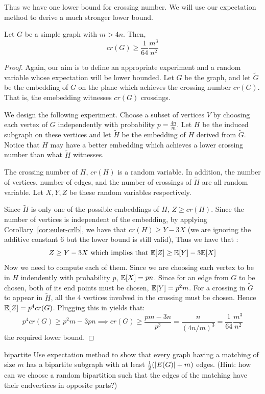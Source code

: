 Thus we have one lower bound for crossing number. We will use our expectation method to derive a much stronger lower bound.

\begin{theorem}
Let $G$ be a simple graph with $m > 4n$. Then,
$$cr(G) \ge \frac{1}{64}\frac{m^3}{n^2}$$
\end{theorem}
\begin{proof}
Again, our aim is to define an appropriate experiment and a random variable whose expectation will be lower bounded. Let $G$ be the graph, and let $\tilde{G}$ be the embedding of $G$ on the plane which achieves the crossing number $cr(G)$. That is, the emebedding witnesses $cr(G)$ crossings.

We design the following experiment. Choose a subset of vertices $V$ by choosing each vertex of $G$ independently with probability $p = \frac{4n}{m}$. Let $H$ be the induced subgraph on these vertices and let $\tilde{H}$ be the embedding of $H$ derived from $\tilde{G}$. Notice that $H$ may have a better embedding which achieves a lower crossing number than what $\tilde{H}$ witnesses.

The crossing number of $H$, $cr(H)$ is a random variable. In addition, the number of vertices, number of edges, and the number of crossings of $\tilde{H}$ are all random variable. Let $X,Y,Z$ be these random variables respectively. 

Since $\tilde{H}$ is only one of the possible embeddings of $H$, $Z \ge cr(H)$. Since the number of vertices is independent of the embedding, by applying Corollary~\ref{cor:euler-crlb}, we have that $cr(H) \ge Y-3X$ (we are ignoring the additive constant 6 but the lower bound is still valid), Thus we have that :
$$Z \ge Y-3X \textrm{ which implies that } {\mathbb E}[Z] \ge {\mathbb E}[Y]-3{\mathbb E}[X]$$
Now we need to compute each of them. Since we are choosing each vertex to be in $H$ indendently with probability $p$, ${\mathbb E}[X] = pn$. Since for an edge from $G$ to be chosen, both of its end points must be chosen, ${\mathbb E}[Y] = p^2m$. For a crossing in $\tilde{G}$ to appear in $\tilde{H}$, all the 4 vertices involved in the crossing must be chosen. Hence ${\mathbb E}[Z] = p^4cr(G)$. Plugging this in yields that:
$$p^4cr(G) \ge p^2m - 3pn \implies cr(G) \ge \frac{pm-3n}{p^3} = \frac{n}{(4n/m)^3} = \frac{1}{64}\frac{m^3}{n^2}$$ the required lower bound.
\end{proof}

\begin{exercise-prob}
\begin{show-ps2}{bipartite}
Use expectation method to show that every graph having a matching of size $m$ has a bipartite subgraph with at least $\frac{1}{2}(|E(G)|+m)$ edges. (Hint: how can we choose a random bipartition such that the edges of the matching have their endvertices in opposite parts?)
\end{show-ps2}
\end{exercise-prob}